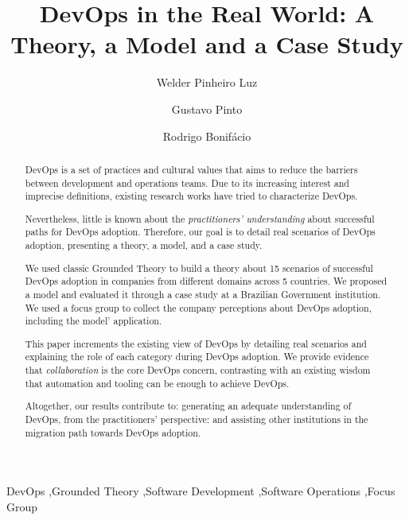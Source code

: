 \documentclass[preprint,12pt,3p]{elsarticle}
\begin{document}
\begin{frontmatter}

\title{DevOps in the Real World: A Theory, a Model and a Case Study}

\author[label1]{Welder Pinheiro Luz}
\address[label1]{Brazilian Federal Court of Accounts}

\author[label2]{Gustavo Pinto}
\address[label2]{Federal University of Par\'a}

\author[label3]{Rodrigo Bonif\'acio}
\address[label3]{University of Bras\'{i}lia}

\begin{abstract}

DevOps is a set of practices and cultural values
that aims to reduce the
barriers between development and operations
teams. Due to its increasing interest and imprecise
definitions, existing research works have tried to
characterize DevOps.

Nevertheless, little is
known about the \emph{practitioners' understanding}
about successful paths for DevOps adoption. Therefore, our goal is to detail
real scenarios of DevOps adoption, presenting a theory, a model, and a case study.

We used classic Grounded Theory to build a theory about 15
scenarios of successful DevOps adoption in companies from different
domains across 5 countries. We proposed a model and evaluated it through
a case study at a Brazilian Government institution. We used a focus group to
collect the company perceptions about DevOps adoption, including the model'
application.

This paper increments the existing view of
DevOps by detailing real scenarios and explaining the role of each
category during DevOps adoption.
We provide evidence that \emph{collaboration} is the core DevOps concern,
contrasting with an existing wisdom that automation and tooling can be enough
to achieve DevOps.

Altogether, our results contribute to: generating
an adequate understanding of DevOps, from the practitioners' perspective; and
assisting other institutions in the migration path towards DevOps adoption.

\end{abstract}

\begin{keyword}
DevOps \sep Grounded Theory \sep Software Development \sep Software Operations \sep Focus Group
\end{keyword}

\end{frontmatter}
























\end{document}

